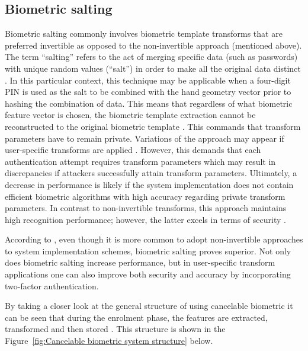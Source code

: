 	\subsection{Biometric salting}
	Biometric salting commonly involves biometric template transforms that are preferred invertible as opposed to the non-invertible approach (mentioned above). The term “salting” refers to the act of merging specific data (such as passwords) with unique random values (“salt”) in order to make all the original data distinct \citep{SyedAhmad2012}. In this particular context, this technique may be applicable when a four-digit PIN is used as the salt to be combined with the hand geometry vector prior to hashing the combination of data. This means that regardless of what biometric feature vector is chosen, the biometric template extraction cannot be reconstructed to the original biometric template \citep{Paul2014,Rathgeb2011}. This commands that transform parameters have to remain private. Variations of the approach may appear if user-specific transforms are applied \citep{teoh2008cancellable}. However, this demands that each authentication attempt requires transform parameters which may result in discrepancies if attackers successfully attain transform parameters. Ultimately, a decrease in performance is likely if the system implementation does not contain efficient biometric algorithms with high accuracy regarding private transform parameters. In contrast to non-invertible transforms, this approach maintains high recognition performance; however, the latter excels in terms of security \citep{Radha2011, Rathgeb2011}.



According to \cite{Rathgeb2011}, even though it is more common to adopt non-invertible approaches to system implementation schemes, biometric salting proves superior. Not only does biometric salting increase performance, but in user-specific transform applications one can also improve both security and accuracy by incorporating two-factor authentication.

By taking a closer look at the general structure of using cancelable biometric it can be seen that during the enrolment phase, the features are extracted, transformed and then stored \citep{Patel2015}. This structure is shown in the Figure~\ref{fig:Cancelable biometric system structure} below.


